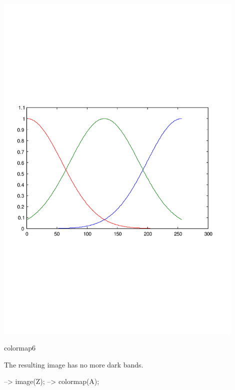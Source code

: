  
\begin{DoxyImage}
\includegraphics[width=12cm]{colormap6}
\caption{colormap6}
\end{DoxyImage}


The resulting image has no more dark bands.


\begin{DoxyVerbInclude}
--> image(Z);
--> colormap(A);
\end{DoxyVerbInclude}


